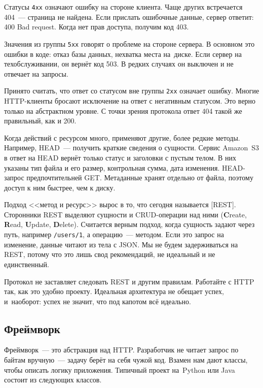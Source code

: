 Статусы \verb|4хх| означают ошибку на стороне клиента. Чаще других встречается
404~--- страница не найдена. Если прислать ошибочные данные, сервер ответит: 400
Bad request. Когда нет прав доступа, получим код 403.

Значения из группы \verb|5хх| говорят о проблеме на стороне сервера. В
основном это ошибки в коде: отказ базы данных, нехватка места на~диске. Если
сервер на техобслуживании, он вернёт код 503. В редких случаях он выключен и
не отвечает на запросы.

Принято считать, что ответ со статусом вне группы \verb|2хх| означает
ошибку. Многие HTTP-клиенты бросают исключение на ответ с негативным статусом.
Это верно только на абстрактном уровне. С точки зрения протокола ответ 404 такой
же правильный, как и 200.


Когда действий с ресурсом много, применяют другие, более редкие
методы. Например, HEAD~--- получить краткие сведения о сущности. Сервис
Amazon~S3 в ответ на HEAD вернёт только статус и заголовки с пустым телом. В
них указаны тип файла и его размер, контрольная сумма, дата
изменения. HEAD-запрос предпочтительней GET. Метаданные хранят отдельно от
файла, поэтому доступ к ним быстрее, чем к диску.


Подход <<метод и ресурс>> вырос в то, что сегодня называется
[REST]. Сторонники REST выделяют сущности и
CRUD-операции над ними (\textbf{C}reate, \textbf{R}ead, \textbf{U}pdate,
\textbf{D}elete). Считается верным подход, когда сущность задают через путь,
например \verb|/users/1|, а операцию~--- методом. Если это запрос на
изменение, данные читают из тела с JSON. Мы не будем задерживаться на REST,
потому что это лишь свод рекомендаций, не идеальный и не единственный.


Протокол не заставляет следовать REST и другим правилам. Работайте с HTTP так,
как это удобно проекту. Идеальная архитектура не обещает успех, и~наоборот:
успех не значит, что под капотом всё идеально.

\subsection{Фреймворк}


Фреймворк~--- это абстракция над HTTP. Разработчик не читает запрос по байтам
вручную~--- задачу берёт на себя чужой код. Взамен нам дают классы, чтобы
описать логику приложения. Типичный проект на~Python или Java состоит из
следующих классов.

